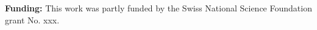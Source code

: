 \documentclass[a0,portrait]{a0poster}
\numberwithin{equation}{section}
\begin{document}
\vspace{1cm} %


\begin{multicols}{2} %






\small{


\textbf{Funding:} This work was partly funded by the Swiss National Science Foundation grant No. xxx.}
\end{multicols}
\end{document}
